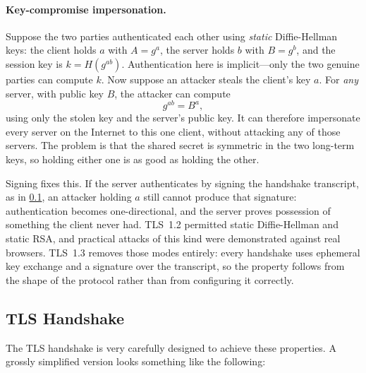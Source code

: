 \paragraph{Key-compromise impersonation.}
Suppose the two parties
authenticated each other using \emph{static} Diffie-Hellman keys: the
client holds $a$ with $A = g^a$, the server holds $b$ with $B = g^b$,
and the session key is $k = H(g^{ab})$.  Authentication here is
implicit---only the two genuine parties can compute $k$.  Now suppose an
attacker steals the client's key $a$.  For \emph{any} server, with
public key $B$, the attacker can compute
\[
  g^{ab} = B^{a},
\]
using only the stolen key and the server's public key.  It can therefore
impersonate every server on the Internet to this one client, without
attacking any of those servers.  The problem is that the shared secret
is symmetric in the two long-term keys, so holding either one is as good
as holding the other.

Signing fixes this.  If the server authenticates by signing the
handshake transcript, as in \cref{sec:tls-handshake}, an attacker
holding $a$ still cannot produce that signature: authentication becomes
one-directional, and the server proves possession of something the
client never had.
TLS~1.2 permitted static Diffie-Hellman and static RSA, and practical
attacks of this kind were demonstrated against real
browsers\autocite{kci2015}.  TLS~1.3 removes those modes entirely:
every handshake uses ephemeral key exchange and a signature over the
transcript, so the property follows from the shape of the protocol
rather than from configuring it correctly.

\subsection{TLS Handshake}
\label{sec:tls-handshake}
The TLS handshake is very carefully designed to achieve these properties. A grossly simplified version looks something like the following:

